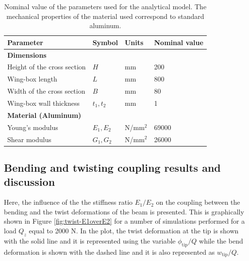   \begin{table}[!htpb]
  \centering
  \begin{tabular}{|l|lll|}
  \hline
  \textbf{Parameter} & \multicolumn{1}{l|}{\textbf{Symbol}} & \multicolumn{1}{l|}{\textbf{Units}} & \textbf{Nominal value} \\ \hline \hline
  {\textbf{Dimensions}} &  &  &  \\ \hline
  Height of the cross section & \multicolumn{1}{l|}{$H$} & \multicolumn{1}{l|}{mm} & 200 \\ \hline
  Wing-box length & \multicolumn{1}{l|}{$L$} & \multicolumn{1}{l|}{mm} & 800 \\ \hline
  Width of the cross section & \multicolumn{1}{l|}{$B$} & \multicolumn{1}{l|}{mm} & 80 \\ \hline
  Wing-box wall thickness & \multicolumn{1}{l|}{$t_1, t_2$} & \multicolumn{1}{l|}{mm} & 1 \\ \hline \hline
  {\textbf{Material (Aluminum)}} &  &  &  \\ \hline
  Young's modulus & \multicolumn{1}{l|}{$E_1, E_2$} & \multicolumn{1}{l|}{N/mm$^2$} & 69000 \\ \hline
  Shear modulus & \multicolumn{1}{l|}{$G_1, G_2$} & \multicolumn{1}{l|}{N/mm$^2$} & 26000 \\ \hline
  \end{tabular}
  \caption[Nominal value of the parameters used for the analytical model]{Nominal value of the parameters used for the analytical model. The mechanical properties of the material used correspond to standard aluminum.}
  \label{tab:parameters_analytical}
  \end{table}

  \clearpage
  \subsection{Bending and twisting coupling results and discussion} \label{subsec:bendingTwistCoupling_results_model}
  
    Here, the influence of the the stiffness ratio $E_1/E_2$ on the coupling between the bending and the twist deformations of the beam is presented. This is graphically shown in Figure \ref{fig:twist-E1overE2} for a number of simulations performed for a load $Q_z$ equal to 2000 N. In the plot, the twist deformation at the tip is shown with the solid line and it is represented using the variable $\phi_{\mathrm{tip}}/Q$ while the bend deformation is shown with the dashed line and it is also represented as $w_{\mathrm{tip}}/Q$.

